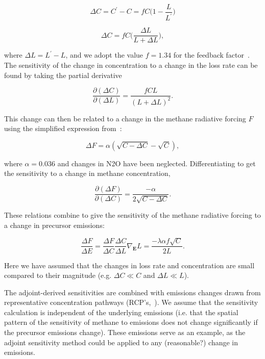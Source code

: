 \begin{equation}
\Delta C = C^{\prime} - C = f C \Big(1 - \frac{L}{L^{\prime}}\Big)
\end{equation}

\begin{equation}
\Delta C = fC\Big(\frac{\Delta L}{L+\Delta L}\Big),
\end{equation}

where $\Delta L = L^{\prime}-L$, and we adopt the value $f=1.34$ for the feedback factor~\citep{ref:holmes2013}. The sensitivity of the change in concentration to a change in the loss rate can be found by taking the partial derivative

\begin{equation}
\frac{\partial (\Delta C)}{\partial (\Delta L)} = \frac{fCL}{(L+\Delta L)^2}.
\end{equation}

This change can then be related to a change in the methane radiative forcing $F$ using the simplified expression from~\citet{ref:myhre1998}:

\begin{equation}
\Delta F = \alpha (\sqrt{C-\Delta C} - \sqrt{C}),
\end{equation}

where $\alpha=0.036$ and changes in N2O have been neglected. Differentiating to get the sensitivity to a change in methane concentration,

\begin{equation}
\frac{\partial (\Delta F)}{\partial (\Delta C)} = \frac{-\alpha}{2\sqrt{C-\Delta C}}.
\end{equation}

These relations combine to give the sensitivity of the methane radiative forcing to a change in precursor emissions:

\begin{equation}
\frac{\Delta F}{\Delta E} = \frac{\Delta F}{\Delta C} \frac{\Delta C}{\Delta L} \nabla_{\mathbf{E}} L = \frac{-\lambda \alpha f \sqrt{C}}{2L}.
\end{equation}

Here we have assumed that the changes in loss rate and concentration are small compared to their magnitude (e.g. $\Delta C \ll C$ and $\Delta L \ll L$).

The adjoint-derived sensitivities are combined with emissions changes drawn from representative concentration pathways (RCP's,~\citet{ref:lamarque2011, ref:vanvuuren2011}). We assume that the sensitivity calculation is independent of the underlying emissions (i.e. that the spatial pattern of the sensitivity of methane to emissions does not change significantly if the precursor emissions change). These emissions serve as an example, as the adjoint sensitivity method could be applied to any (reasonable?) change in emissions.